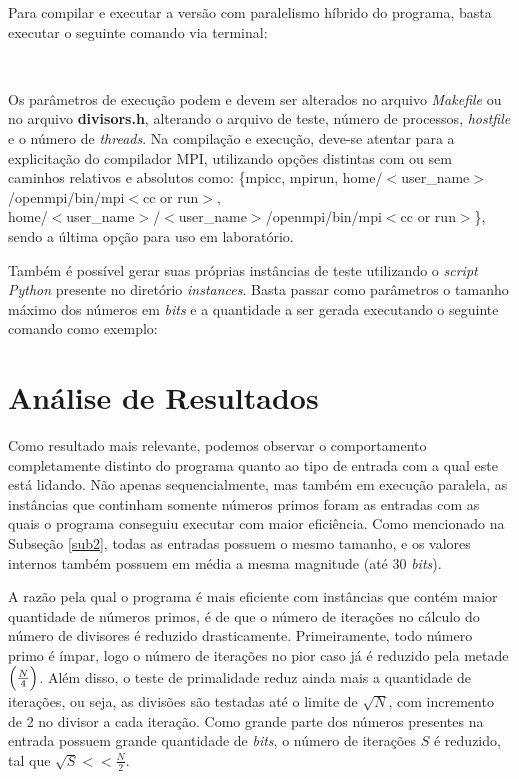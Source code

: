 \documentclass[a4paper, 12pt]{article}
\begin{document}
\vspace{0.2cm}
\noindent Para compilar e executar a versão com paralelismo híbrido do programa, basta executar o seguinte comando via terminal:

\begin{center}
    \\
    \vspace{0.5cm}
\end{center}

Os parâmetros de execução podem e devem ser alterados no arquivo \emph{Makefile} ou no arquivo \textbf{divisors.h}, alterando o arquivo de teste, número de processos, \emph{hostfile} e o número de \emph{threads}. Na compilação e execução, deve-se atentar para a explicitação do compilador MPI, utilizando opções distintas com ou sem caminhos relativos e absolutos como: \{mpicc, mpirun, home/\(<\)user\_name\(>\)/openmpi/bin/mpi\(<\)cc or run\(>\), \\home/\(<\)user\_name\(>\)/\(<\)user\_name\(>\)/openmpi/bin/mpi\(<\)cc or run\(>\)\}, sendo a última opção para uso em laboratório.

Também é possível gerar suas próprias instâncias de teste utilizando o \emph{script Python} presente no diretório \emph{instances}. Basta passar como parâmetros o tamanho máximo dos números em \emph{bits} e a quantidade a ser gerada executando o seguinte comando como exemplo:

\begin{center}
\end{center}

\section{Análise de Resultados}

Como resultado mais relevante, podemos observar o comportamento completamente distinto do programa quanto ao tipo de entrada com a qual este está lidando. Não apenas sequencialmente, mas também em execução paralela, as instâncias que continham somente números primos foram as entradas com as quais o programa conseguiu executar com maior eficiência. Como mencionado na Subseção \ref{sub2}, todas as entradas possuem o mesmo tamanho, e os valores internos também possuem em média a mesma magnitude (até 30 \emph{bits}).

A razão pela qual o programa é mais eficiente com instâncias que contém maior quantidade de números primos, é de que o número de iterações no cálculo do número de divisores é reduzido drasticamente. Primeiramente, todo número primo é ímpar, logo o número de iterações no pior caso já é reduzido pela metade $\Bigl(\frac{N}{4}\Bigl)$. Além disso, o teste de primalidade reduz ainda mais a quantidade de iterações, ou seja, as divisões são testadas até o limite de \(\sqrt{N}\), com incremento de 2 no divisor a cada iteração. Como grande parte dos números presentes na entrada possuem grande quantidade de \emph{bits}, o número de iterações \(S\) é reduzido, tal que \(\sqrt{S} << \frac{N}{2}\).
\end{document}
